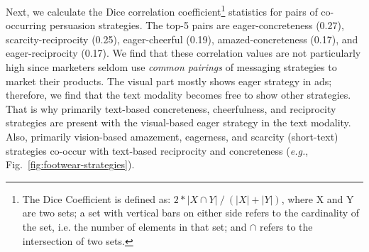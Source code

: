 Next, we calculate the Dice correlation coefficient\footnote{The Dice Coefficient is defined as: \; \(2*|X \cap Y|\: / \:(|X|+|Y|)\), where X and Y are two sets; a set with vertical bars on either side refers to the cardinality of the set, i.e. the number of elements in that set; and \(\cap\)  refers to the intersection of two sets.} statistics for pairs of co-occurring persuasion strategies. The top-5 pairs are eager-concreteness (0.27), scarcity-reciprocity (0.25), eager-cheerful (0.19), amazed-concreteness (0.17), and eager-reciprocity (0.17). We find that these correlation values are not particularly high since marketers seldom use \textit{common pairings} of messaging strategies to market their products. The visual part mostly shows eager strategy in ads; therefore, we find that the text modality becomes free to show other strategies. That is why primarily text-based concreteness, cheerfulness, and reciprocity strategies are present with the visual-based eager strategy in the text modality. Also, primarily vision-based amazement, eagerness, and scarcity (short-text) strategies co-occur with text-based reciprocity and concreteness (\textit{e.g.}, Fig.~\ref{fig:footwear-strategies}).


